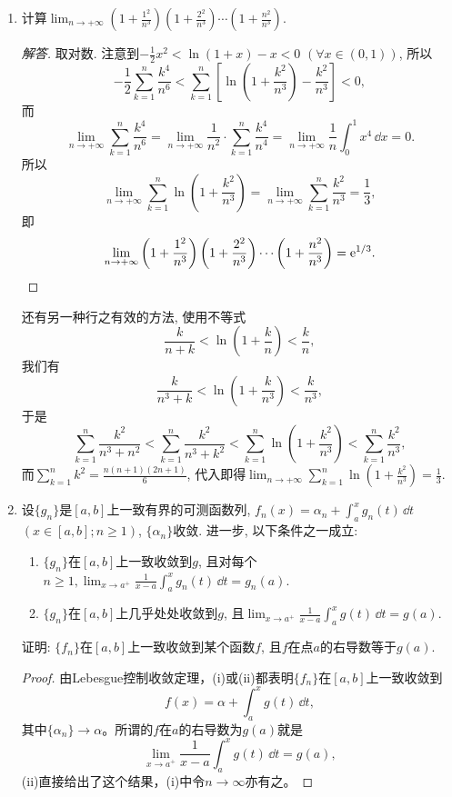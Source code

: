 \begin{quiza}
\begin{enumerate}
\begin{proof}
\end{proof}
\item 计算\(\lim_{n\rightarrow+\infty}\left(1+\frac{1^2}{n^3}\right)\left(1+\frac{2^2}{n^3}\right)\cdots\left(1+\frac{n^2}{n^3}\right).\)
\begin{proof}[解答]
取对数. 注意到\(-\frac{1}{2}x^2<\ln(1+x)-x<0\) \((\forall x\in (0,1))\), 所以
\[-\frac{1}{2}\sum_{k=1}^{n}\frac{k^4}{n^6}
<\sum_{k=1}^{n}\left[\ln\left(1+\frac{k^2}{n^3}\right)-\frac{k^2}{n^3}\right]<0,\]
而\[\lim_{n\rightarrow+\infty}\sum_{k=1}^{n}\frac{k^4}{n^6}
=\lim_{n\rightarrow+\infty}\frac{1}{n^2}\cdot\sum_{k=1}^{n}\frac{k^4}{n^4}
=\lim_{n\rightarrow+\infty}\frac{1}{n}\int_{0}^{1}x^4\,\dd x=0.\]
所以\[\lim_{n\rightarrow+\infty}\sum_{k=1}^{n}\ln\left(1+\frac{k^2}{n^3}\right)
=\lim_{n\rightarrow+\infty}\sum_{k=1}^{n}\frac{k^2}{n^3}=\frac{1}{3},\] 即
\[\lim_{n\rightarrow+\infty}\left(1+\frac{1^2}{n^3}\right)\left(1+\frac{2^2}{n^3}\right)\cdots\left(1+\frac{n^2}{n^3}\right)=\mathrm{e}^{1/3}.\qedhere\]
\end{proof}

还有另一种行之有效的方法, 使用不等式\[\frac{k}{n+k}<\ln\left(1+\frac{k}{n}\right)<\frac{k}{n},\]我们有\[\frac{k}{n^3+k}<\ln\left(1+\frac{k}{n^3}\right)<\frac{k}{n^3},\]
于是\[\sum_{k=1}^{n}\frac{k^2}{n^3+n^2}<\sum_{k=1}^{n}\frac{k^2}{n^3+k^2}<\sum_{k=1}^{n}\ln\left(1+\frac{k^2}{n^3}\right)<\sum_{k=1}^{n}\frac{k^2}{n^3},\]
而\(\sum_{k=1}^{n}k^2=\frac{n(n+1)(2n+1)}{6}\), 代入即得\(\lim_{n\rightarrow+\infty}\sum_{k=1}^{n}\ln\left(1+\frac{k^2}{n^3}\right)=\frac{1}{3}\).
\item 设\(\{g_n\}\)是\([a,b]\)上一致有界的可测函数列, \(f_n(x)=\alpha_n+\int_{a}^{x}g_n(t)\,\dd t\) \((x\in [a,b];n\geqslant 1)\), \(\{\alpha_n\}\)收敛. 进一步, 以下条件之一成立:
\begin{enumerate}[label=(\roman*)]
\item \(\{g_n\}\)在\([a,b]\)上一致收敛到\(g\), 且对每个\(n\geqslant 1,\lim_{x\rightarrow a^+}\frac{1}{x-a}\int_{a}^{x}g_n(t)\,\dd t=g_n(a)\).
\item \(\{g_n\}\)在\([a,b]\)上几乎处处收敛到\(g\), 且\(\lim_{x\rightarrow a^+}\frac{1}{x-a}\int_{a}^{x}g(t)\,\dd t=g(a)\).
\end{enumerate}
证明: \(\{f_n\}\)在\([a,b]\)上一致收敛到某个函数\(f\), 且\(f\)在点\(a\)的右导数等于\(g(a)\).
\begin{proof}
由Lebesgue控制收敛定理，(i)或(ii)都表明$\{f_n\}$在$[a,b]$上一致收敛到
\[f(x)=\alpha+\int_a^xg(t)\,\dd t,\]
其中$\{\alpha_n\}\to\alpha$。所谓的$f$在$a$的右导数为$g(a)$就是
\[\lim_{x\rightarrow a^+}\frac{1}{x-a}\int_{a}^{x}g(t)\,\dd t=g(a),\]
(ii)直接给出了这个结果，(i)中令$n\to\infty$亦有之。
\end{proof}
\end{enumerate}
\end{quiza}
